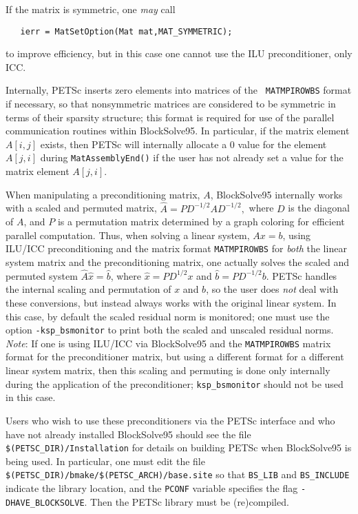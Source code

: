 If the matrix is symmetric, one {\em may} call
\begin{verbatim}
   ierr = MatSetOption(Mat mat,MAT_SYMMETRIC);
\end{verbatim}
to improve efficiency, but in this case one cannot use the ILU 
preconditioner, only ICC.

Internally, PETSc inserts zero elements into matrices of the {\tt
MATMPIROWBS} format if necessary, so that nonsymmetric matrices are
considered to be symmetric in terms of their sparsity structure; this
format is required for use of the parallel communication routines
within BlockSolve95. In particular, if the matrix element $A[i,j]$
exists, then PETSc will internally allocate a 0 value for the element
$A[j,i]$ during {\tt MatAssemblyEnd()} if the user has not already set
a value for the matrix element $A[j,i]$.

When manipulating a preconditioning matrix, $A$, BlockSolve95
internally works with a scaled and permuted matrix, $\hat{A} = P
D^{-1/2} A D^{-1/2},$ where $D$ is the diagonal of $A$, and $P$ is a
permutation matrix determined by a graph coloring for efficient
parallel computation.  Thus, when solving a linear system, $Ax=b$,
using ILU/ICC preconditioning and the matrix format {\tt MATMPIROWBS}
for {\em both} the linear system matrix and the preconditioning
matrix, one actually solves the scaled and permuted system $\hat{A}
\hat{x} = \hat{b}$, where $\hat{x} = P D^{1/2} x$ and $\hat{b} = P
D^{-1/2} b$.  PETSc handles the internal scaling and permutation of
$x$ and $b$, so the user does {\em not} deal with these conversions, 
but instead always works with the original linear system.  In
this case, by default the scaled residual norm is monitored; one must use the
option {\tt -ksp\_bsmonitor}  to print both the
scaled and unscaled residual norms. {\em Note}: If one is using ILU/ICC via
BlockSolve95 and the {\tt MATMPIROWBS} matrix format for the 
preconditioner matrix, but using a different format for a different
linear system matrix, then this scaling and permuting is done only
internally during the application of the preconditioner; 
{\tt ksp\_bsmonitor} should not be used in this case.

Users who wish to use these preconditioners via the PETSc interface and
who have not already installed BlockSolve95 should see
the file {\tt \$(PETSC\_DIR)/Installation} for details on building
PETSc when BlockSolve95 is being used.  In particular, one must edit
the file {\tt \$(PETSC\_DIR)/bmake/\$(PETSC\_ARCH)/base.site} so that
{\tt BS\_LIB} and {\tt BS\_INCLUDE} indicate the library location, and
the {\tt PCONF} variable specifies the flag {\tt -DHAVE\_BLOCKSOLVE}.
Then the PETSc library must be (re)compiled.


